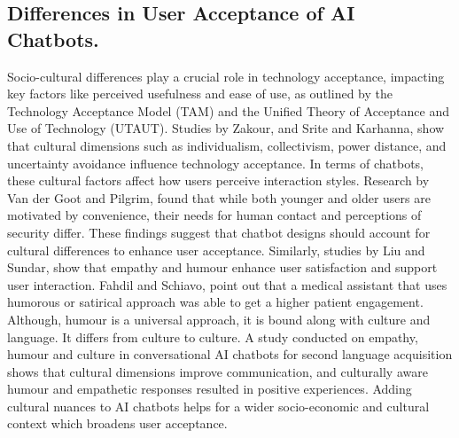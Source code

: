 \documentclass[conference]{IEEEtran}
\begin{document}
\subsection{Differences in User Acceptance of AI Chatbots.}
Socio-cultural differences play a crucial role in technology acceptance, impacting key factors like perceived usefulness and ease of use, as outlined by the Technology Acceptance Model (TAM) and the Unified Theory of Acceptance and Use of Technology (UTAUT). Studies by Zakour\cite{b10}, and Srite and Karhanna\cite{b11}, show that cultural dimensions such as individualism, collectivism, power distance, and uncertainty avoidance influence technology acceptance. In terms of chatbots, these cultural factors affect how users perceive interaction styles. Research by Van der Goot and Pilgrim\cite{b12}, found that while both younger and older users are motivated by convenience, their needs for human contact and perceptions of security differ. These findings suggest that chatbot designs should account for cultural differences to enhance user acceptance\cite{b13}. Similarly, studies by Liu and Sundar\cite{b14}, show that empathy and humour enhance user satisfaction and support user interaction. Fahdil and Schiavo\cite{b15}, point out that a medical assistant that uses humorous or satirical approach was able to get a higher patient engagement. Although, humour is a universal approach, it is bound along with culture and language. It differs from culture to culture. A study conducted on empathy, humour and culture in conversational AI chatbots for second language acquisition shows that cultural dimensions improve communication, and culturally aware humour and empathetic responses resulted in positive experiences. Adding cultural nuances to AI chatbots helps for a wider socio-economic and cultural context which broadens user acceptance\cite{b16}.
\end{document}
